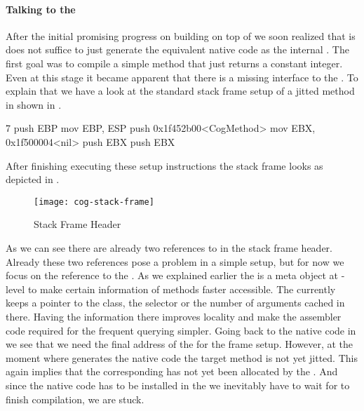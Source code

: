 \paragraph{Talking to the \JIT}
After the initial promising progress on building \NBJ on top of \B we soon realized that is does not suffice to just generate the equivalent native code as the \VM internal \JIT.
The first goal was to compile a simple method that just returns a constant integer.
Even at this stage it became apparent that there is a missing interface to the \JIT.
To explain that we have a look at the standard stack frame setup of a jitted method in \Cog shown in .
%
\begin{numstcode}[
	caption={\Cog \JIT Stackframe Setup},
	label={lst:val-nabujito-cog-frame}]{7}
push EBP
mov  EBP, ESP
push 0x1f452b00<CogMethod>
mov  EBX, 0x1f500004<nil>
push EBX
push EBX
\end{numstcode} 
%
After finishing executing these setup instructions the stack frame looks as depicted in .
%
\begin{figure}[h]
	\centering
	\texttt{[image: cog-stack-frame]}
	\caption{\Cog Stack Frame Header}
\end{figure}
%
As we can see there are already two references to  in the stack frame header.
Already these two references pose a problem in a simple \NBJ setup, but for now we focus on the reference to the \CogMethod.
As we explained earlier the \CogMethod is a meta object at \JIT-level to make certain information of \PH methods faster accessible.
The \VM currently keeps a pointer to the class, the selector or the number of arguments cached in there.
Having the information there improves locality and make the assembler code required for the frequent querying simpler.
Going back to the native code in  we see that we need the final address of the \CogMethod for the frame setup.
However, at the moment where \NBJ generates the native code the target method is not yet jitted.
This again implies that the corresponding \CogMethod has not yet been allocated by the \JIT.
And since the native code has to be installed in the \JIT we inevitably have to wait for \NBJ to finish compilation, we are stuck.

